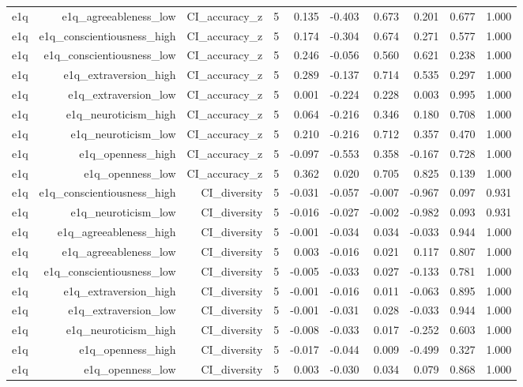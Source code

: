 \documentclass[11pt]{article}
\begin{document}
\begin{landscape}
\begin{longtable}{@{}lrrrrrrrrr@{}}
e1q & e1q\_agreeableness\_low & CI\_accuracy\_z & 5 & 0.135 & -0.403 & 0.673 & 0.201 & 0.677 & 1.000 \\
e1q & e1q\_conscientiousness\_high & CI\_accuracy\_z & 5 & 0.174 & -0.304 & 0.674 & 0.271 & 0.577 & 1.000 \\
e1q & e1q\_conscientiousness\_low & CI\_accuracy\_z & 5 & 0.246 & -0.056 & 0.560 & 0.621 & 0.238 & 1.000 \\
e1q & e1q\_extraversion\_high & CI\_accuracy\_z & 5 & 0.289 & -0.137 & 0.714 & 0.535 & 0.297 & 1.000 \\
e1q & e1q\_extraversion\_low & CI\_accuracy\_z & 5 & 0.001 & -0.224 & 0.228 & 0.003 & 0.995 & 1.000 \\
e1q & e1q\_neuroticism\_high & CI\_accuracy\_z & 5 & 0.064 & -0.216 & 0.346 & 0.180 & 0.708 & 1.000 \\
e1q & e1q\_neuroticism\_low & CI\_accuracy\_z & 5 & 0.210 & -0.216 & 0.712 & 0.357 & 0.470 & 1.000 \\
e1q & e1q\_openness\_high & CI\_accuracy\_z & 5 & -0.097 & -0.553 & 0.358 & -0.167 & 0.728 & 1.000 \\
e1q & e1q\_openness\_low & CI\_accuracy\_z & 5 & 0.362 & 0.020 & 0.705 & 0.825 & 0.139 & 1.000 \\
e1q & e1q\_conscientiousness\_high & CI\_diversity & 5 & -0.031 & -0.057 & -0.007 & -0.967 & 0.097 & 0.931 \\
e1q & e1q\_neuroticism\_low & CI\_diversity & 5 & -0.016 & -0.027 & -0.002 & -0.982 & 0.093 & 0.931 \\
e1q & e1q\_agreeableness\_high & CI\_diversity & 5 & -0.001 & -0.034 & 0.034 & -0.033 & 0.944 & 1.000 \\
e1q & e1q\_agreeableness\_low & CI\_diversity & 5 & 0.003 & -0.016 & 0.021 & 0.117 & 0.807 & 1.000 \\
e1q & e1q\_conscientiousness\_low & CI\_diversity & 5 & -0.005 & -0.033 & 0.027 & -0.133 & 0.781 & 1.000 \\
e1q & e1q\_extraversion\_high & CI\_diversity & 5 & -0.001 & -0.016 & 0.011 & -0.063 & 0.895 & 1.000 \\
e1q & e1q\_extraversion\_low & CI\_diversity & 5 & -0.001 & -0.031 & 0.028 & -0.033 & 0.944 & 1.000 \\
e1q & e1q\_neuroticism\_high & CI\_diversity & 5 & -0.008 & -0.033 & 0.017 & -0.252 & 0.603 & 1.000 \\
e1q & e1q\_openness\_high & CI\_diversity & 5 & -0.017 & -0.044 & 0.009 & -0.499 & 0.327 & 1.000 \\
e1q & e1q\_openness\_low & CI\_diversity & 5 & 0.003 & -0.030 & 0.034 & 0.079 & 0.868 & 1.000 \\

\end{longtable}
\end{landscape}
\end{document}
